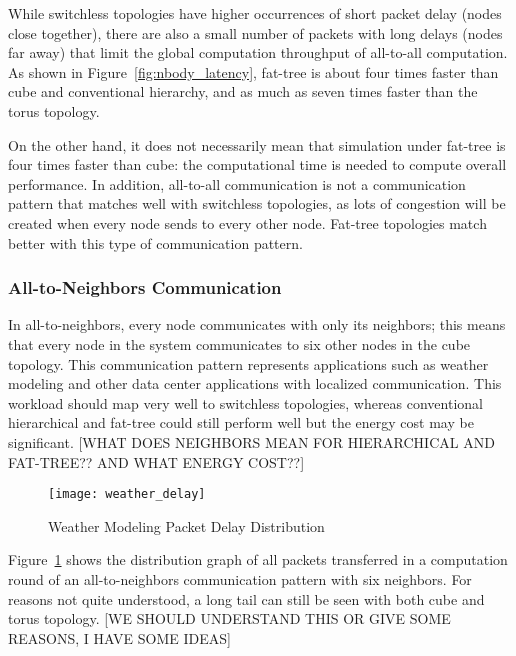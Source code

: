 While switchless topologies have higher occurrences of short packet delay (nodes close together), there are also a small number of packets with long delays (nodes far away) that limit the global computation throughput of all-to-all computation. As shown in Figure~\ref{fig:nbody_latency}, fat-tree is about four times faster than cube and conventional hierarchy, and as much as seven times faster than the torus topology.

On the other hand, it does not necessarily mean that simulation under fat-tree is four times faster than cube: the computational time is needed to compute overall performance.  In addition, all-to-all communication is not a communication pattern that matches well with switchless topologies, as lots of congestion will be created when every node sends to every other node.  Fat-tree topologies match better with this type of communication pattern.

\subsubsection{All-to-Neighbors Communication}
In all-to-neighbors, every node communicates with only its neighbors; this means that every node in the system communicates to six other nodes in the cube topology. This communication pattern represents applications such as weather modeling and other data center applications with localized communication.  This workload should map very well to switchless topologies, whereas conventional hierarchical and fat-tree could still perform well but the energy cost may be significant. [WHAT DOES NEIGHBORS MEAN FOR HIERARCHICAL AND FAT-TREE?? AND WHAT ENERGY COST??]

\captionsetup[subfloat]{captionskip=-0.003in}
\begin{figure}
    \centering
    \texttt{[image: weather\_delay]}    
    \vspace{-0.1in}
    \caption{Weather Modeling Packet Delay Distribution}
    \label{fig:weather_packetdelay}
\end{figure}

Figure~\ref{fig:weather_packetdelay} shows the distribution graph of all packets transferred in a computation round of an all-to-neighbors communication pattern with six neighbors. For reasons not quite understood, a long tail can still be seen with both cube and torus topology. [WE SHOULD UNDERSTAND THIS OR GIVE SOME REASONS, I HAVE SOME IDEAS]

